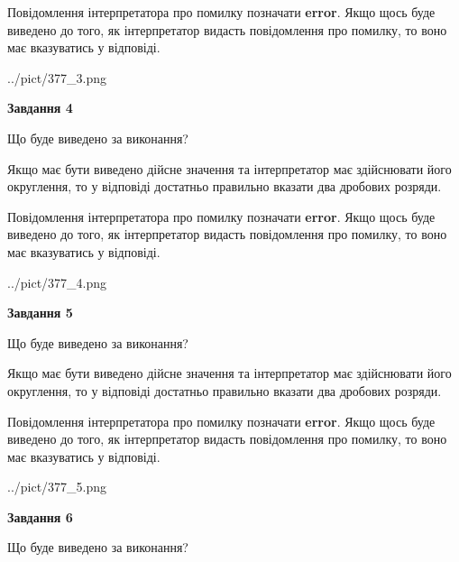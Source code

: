\documentclass[12pt, ukrainian]{article}
\begin{document}
{\begin {Large}
Повідомлення інтерпретатора про помилку позначати \textbf{error}.
Якщо щось буде виведено до того, як інтерпретатор видасть повідомлення про помилку, 
то воно має вказуватись у відповіді. \par

\begin{center}
	{../pict/377_3.png}
\end{center}
\newpage

{\begin {center}\textbf{Завдання 4}\end {center}}\par
Що буде виведено за виконання? \par

Якщо має бути виведено дійсне значення та інтерпретатор має здійснювати його округлення, 
то у відповіді достатньо правильно вказати два дробових розряди.

Повідомлення інтерпретатора про помилку позначати \textbf{error}.
Якщо щось буде виведено до того, як інтерпретатор видасть повідомлення про помилку, 
то воно має вказуватись у відповіді. \par

\begin{center}
	{../pict/377_4.png}
\end{center}
\newpage

{\begin {center}\textbf{Завдання 5}\end {center}}\par
Що буде виведено за виконання? \par

Якщо має бути виведено дійсне значення та інтерпретатор має здійснювати його округлення, 
то у відповіді достатньо правильно вказати два дробових розряди.

Повідомлення інтерпретатора про помилку позначати \textbf{error}.
Якщо щось буде виведено до того, як інтерпретатор видасть повідомлення про помилку, 
то воно має вказуватись у відповіді. \par

\begin{center}
	{../pict/377_5.png}
\end{center}
\newpage

{\begin {center}\textbf{Завдання 6}\end {center}}\par
Що буде виведено за виконання? \par


\end{Large}}
\end{document}
